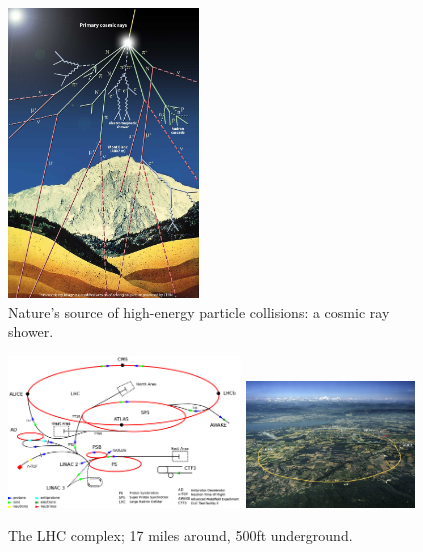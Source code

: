 \begin{figure}[hb!]
\centering
\includegraphics[width=0.45\textwidth]{figs/cosmic-rays.jpg}
\caption{Nature's source of high-energy particle collisions: a cosmic ray shower.}
\label{fig:cosmicrays}
\end{figure}

\begin{figure}[hb!]
\centering
\includegraphics[width=0.55\textwidth]{figs/lhcschematic.png}
\includegraphics[width=0.4\textwidth]{figs/lhc.jpg}
\caption{The LHC complex; 17 miles around, 500ft underground.}
\label{fig:lhc}
\end{figure}
